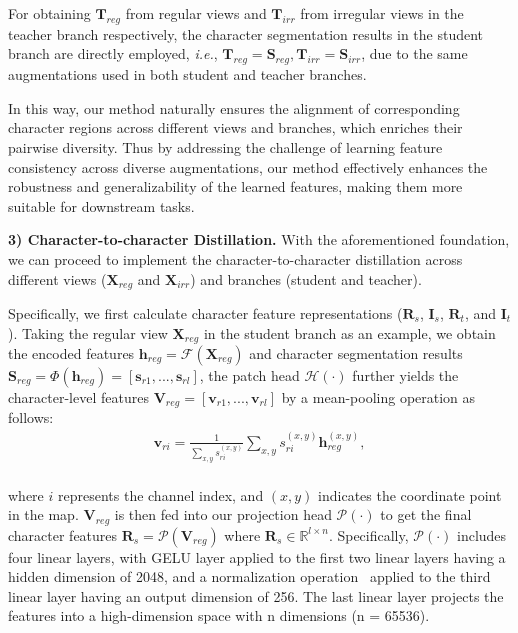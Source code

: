 \documentclass[10pt,twocolumn,letterpaper]{article}
\begin{document}
For obtaining $\mathbf{T}_{reg}$ from regular views and $\mathbf{T}_{irr}$ from irregular views in the teacher branch respectively, the character segmentation results in the student branch are directly employed, \emph{i.e.}, $\mathbf{T}_{reg} = \mathbf{S}_{reg}, \mathbf{T}_{irr} = \mathbf{S}_{irr}$, due to the same augmentations used in both student and teacher branches.

In this way, our method naturally ensures the alignment of corresponding character regions across different views and branches, which enriches their pairwise diversity. Thus by addressing the challenge of learning feature consistency across diverse augmentations, our method effectively enhances the robustness and generalizability of the learned features, making them more suitable for downstream tasks. 

\noindent \textbf{3) Character-to-character Distillation.}\label{section:sec3.2.3}
With the aforementioned foundation, we can proceed to implement the character-to-character distillation across different views ($\mathbf{X}_{reg}$ and $\mathbf{X}_{irr}$) and branches (student and teacher).

Specifically, we first calculate character feature representations ($\mathbf{R}_{s}$, $\mathbf{I}_{s}$, $\mathbf{R}_{t}$, and $\mathbf{I}_{t}$).
Taking the regular view $\mathbf{X}_{reg}$ in the student branch as an example, we obtain the encoded features $\mathbf{h}_{reg} = \mathcal{F}(\mathbf{X}_{reg})$ and character segmentation results $\mathbf{S}_{reg} = \mathcal{\varPhi}(\mathbf{h}_{reg}) =[\mathbf{s}_{r1}, ..., \mathbf{s}_{rl}]$, the patch head $\mathcal{H}(\cdot)$ further yields the character-level features $\mathbf{V}_{reg} = [\mathbf{v}_{r1}, ..., \mathbf{v}_{rl}]$ by a mean-pooling operation as follows:
 {\setlength\abovedisplayskip{1pt}
\setlength\belowdisplayskip{1pt}
\begin{equation}
    \begin{aligned}
\mathbf{v}_{ri} = \frac{1}{\sum_{x,y}s_{ri}^{(x,y)}}\sum_{x,y}s_{ri}^{(x,y)}\mathbf{h}_{reg}^{(x,y)},\\
    \end{aligned}
\end{equation}}
 
\noindent where $i$ represents the channel index, and $(x, y)$ indicates the coordinate point in the map. $\mathbf{V}_{reg}$ is then fed into our projection head $\mathcal{P}(\cdot)$ to get the final character features $\mathbf{R}_{s}=\mathcal{P}(\mathbf{V}_{reg})$ where $\mathbf{R}_{s} \in \mathbb{R}^{l \times n}$. Specifically, $\mathcal{P}(\cdot)$ includes four linear layers, with GELU layer applied to the first two linear layers having a hidden dimension of 2048, and a normalization operation~\cite{Dino} applied to the third linear layer having an output dimension of 256. The last linear layer projects the features into a high-dimension space with n dimensions (n = 65536). 
\end{document}
